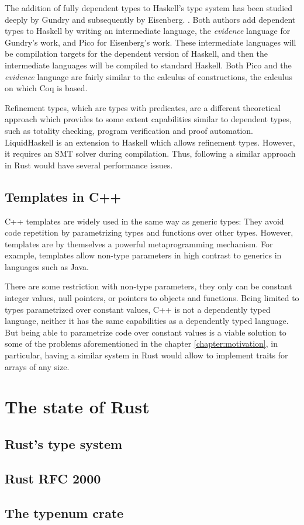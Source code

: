 The addition of fully dependent types to Haskell's type
system has been studied deeply by Gundry \cite{gundry} and subsequently by
Eisenberg. \cite{eisenberg}. Both authors add dependent types to Haskell by
writing an intermediate language, the \textit{evidence} language for Gundry's
work, and Pico for Eisenberg's work. These intermediate languages will be
compilation targets for the dependent version of Haskell, and then the
intermediate languages will be compiled to standard Haskell. Both Pico and the
\textit{evidence} language are fairly similar to the calculus of constructions,
the calculus on which Coq is based.

Refinement types, which are types with predicates,
are a different theoretical approach which provides to some extent capabilities
similar to dependent types, such as totality checking, program verification and
proof automation. LiquidHaskell is an extension to Haskell which allows
refinement types. However, it requires an SMT solver during compilation. 
\cite{liquidhaskell} Thus, following a similar approach in Rust would have several performance issues.

\subsection{Templates in C++} 


C++ templates are widely used in the same way as
generic types: They avoid code repetition by parametrizing types and functions
over other types. However, templates are by themselves a powerful metaprogramming
mechanism.  \cite{template_metaprogramming} For example, templates allow
non-type parameters in high contrast to generics in languages such as Java.

There are some restriction with non-type parameters, they only can be constant
integer values, null pointers, or pointers to objects and functions.
\cite{templates} Being limited to types parametrized over constant values, C++
is not a dependently typed language, neither it has the same capabilities as a
dependently typed language. But being able to parametrize code over constant
values is a viable solution to some of the problems aforementioned in the
chapter \ref{chapter:motivation}, in particular, having a similar system in Rust would
allow to implement traits for arrays of any size.





\section{The state of Rust} 

\subsection{Rust's type system} 

\subsection{Rust RFC 2000} 

\subsection{The typenum crate}
